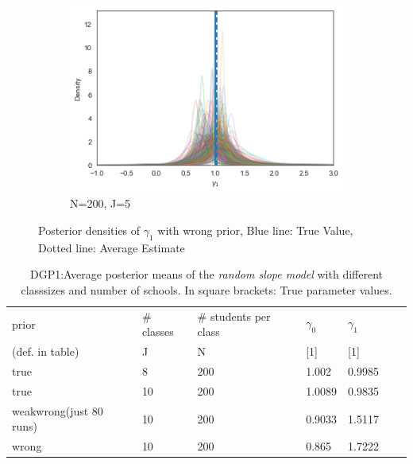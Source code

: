 \begin{figure}[h!]
  \begin{subfigure}[b]{0.3\linewidth}
    \includegraphics[width=\linewidth]{graphics/posterior_plot_gamma1_wrong_smallJ}
    \caption{N=200, J=5}
  \end{subfigure}
  \caption{Posterior densities of $\gamma_1$ with wrong prior, Blue line: True Value, Dotted line: Average Estimate}
  \label{fig:posterior_wrong_gamma1}
\end{figure}


\begin{table}[!ht]
\begin{center}
\begin{tabular}{l  l  l  l  l  l  l  }
prior & \# classes & \#  students per class & $\gamma_0$ & $\gamma_1$\\
(def. in table)  & J  & N &  [1] &  [1] \\
\hline
true & 8  &  200  &  1.002  &  0.9985 \\
true & 10  &  200  &  1.0089  &  0.9835 \\
weakwrong(just 80 runs) & 10  &  200  &  0.9033  &  1.5117\\
wrong & 10  &  200  &  0.865  &  1.7222\\
\end{tabular}
\end{center}
\caption{DGP1:Average posterior means of the \emph{random slope model} with different classsizes and number of schools. In square brackets: True parameter values.}
\label{tab:bias_first}
\end{table}

